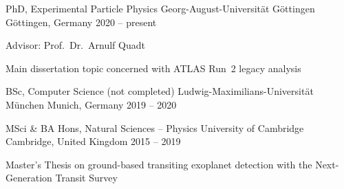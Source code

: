 \begin{cventries}
  \cventry%
    {PhD, Experimental Particle Physics} %
    {Georg-August-Universit\"at G\"ottingen} %
    {G\"ottingen, Germany} %
    {2020 -- present} %
    {%
      \begin{cvitems} %
        \item {Advisor: Prof.\ Dr.\ Arnulf Quadt}%
        \item {Main dissertation topic concerned with ATLAS Run~2 \ttHbb legacy analysis}%
      \end{cvitems}%
    }%

  \cventry%
    {BSc, Computer Science (not completed)} %
    {Ludwig-Maximilians-Universit\"at M\"unchen} %
    {Munich, Germany} %
    {2019 -- 2020} %
    {%
    }%

  \cventry%
    {MSci \& BA Hons, Natural Sciences -- Physics} %
    {University of Cambridge} %
    {Cambridge, United Kingdom} %
    {2015 -- 2019} %
    {%
      \begin{cvitems} %
        \item {%
          Master's Thesis on ground-based transiting exoplanet detection with the Next-Generation Transit Survey%
        }%
      \end{cvitems}%
    }%
\end{cventries}
